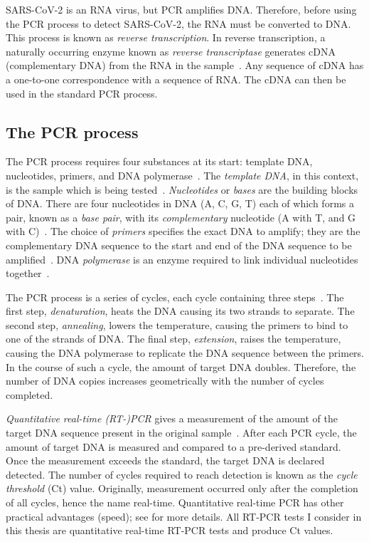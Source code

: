 \documentclass[thesis.tex]{subfiles}
\begin{document}
SARS-CoV-2 is an RNA virus, but PCR amplifies DNA.
Therefore, before using the PCR process to detect SARS-CoV-2, the RNA must be converted to DNA.
This process is known as \emph{reverse transcription}.
In reverse transcription, a naturally occurring enzyme known as \emph{reverse transcriptase} generates cDNA (complementary DNA) from the RNA in the sample~\autocite{valasekPower}.
Any sequence of cDNA has a one-to-one correspondence with a sequence of RNA.
The cDNA can then be used in the standard PCR process.

\subsection{The PCR process} \label{biology-data:sec:PCR-process}


The PCR process requires four substances at its start: template DNA, nucleotides, primers, and DNA polymerase~\autocite{garibyanPCR}.
The \emph{template DNA}, in this context, is the sample which is being tested~\autocite{caseTemplate}.
\emph{Nucleotides} or \emph{bases} are the building blocks of DNA.
There are four nucleotides in DNA (A, C, G, T) each of which forms a pair, known as a \emph{base pair}, with its \emph{complementary} nucleotide (A with T, and G with C)~\autocite{batesBase}.
The choice of \emph{primers} specifies the exact DNA to amplify; they are the complementary DNA sequence to the start and end of the DNA sequence to be amplified~\autocite{garibyanPCR}.
DNA \emph{polymerase} is an enzyme required to link individual nucleotides together~\autocite{garibyanPCR}.

The PCR process is a series of cycles, each cycle containing three steps~\autocite{powledgePCR,garibyanPCR}.
The first step, \emph{denaturation}, heats the DNA causing its two strands to separate.
The second step, \emph{annealing}, lowers the temperature, causing the primers to bind to one of the strands of DNA.
The final step, \emph{extension}, raises the temperature, causing the DNA polymerase to replicate the DNA sequence between the primers. 
In the course of such a cycle, the amount of target DNA doubles.
Therefore, the number of DNA copies increases geometrically with the number of cycles completed.

\emph{Quantitative real-time (RT-)PCR} gives a measurement of the amount of the target DNA sequence present in the original sample~\autocite{yangPCRdiagnostics}.
After each PCR cycle, the amount of target DNA is measured and compared to a pre-derived standard.
Once the measurement exceeds the standard, the target DNA is declared detected. 
The number of cycles required to reach detection is known as the \emph{cycle threshold} (Ct) value.
Originally, measurement occurred only after the completion of all cycles, hence the name real-time.
Quantitative real-time PCR has other practical advantages (\eg speed); see \textcite{yangPCRdiagnostics,valasekPower} for more details.
All RT-PCR tests I consider in this thesis are quantitative real-time RT-PCR tests and produce Ct values.
\end{document}
